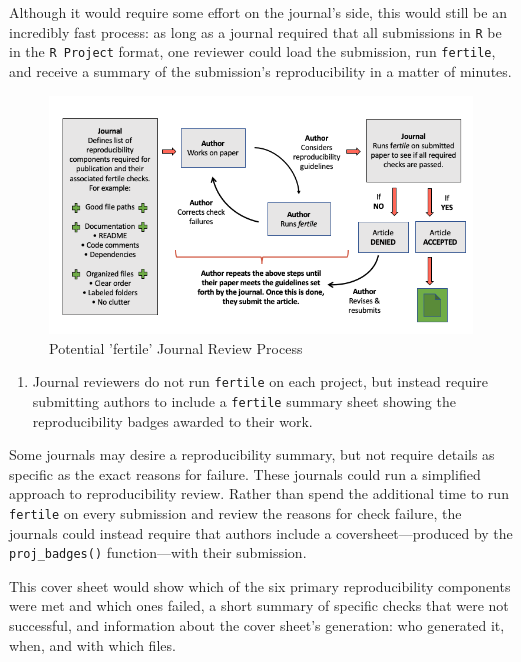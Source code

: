\documentclass[12pt,twoside]{reedthesis}
\providecommand{\tightlist}{%
  \setlength{\itemsep}{0pt}\setlength{\parskip}{0pt}}
\begin{document}
Although it would require some effort on the journal's side, this would still be an incredibly fast process: as long as a journal required that all submissions in \texttt{R} be in the \texttt{R\ Project} format, one reviewer could load the submission, run \texttt{fertile}, and receive a summary of the submission's reproducibility in a matter of minutes.
\begin{figure}
\includegraphics[width=1\linewidth]{figure/journal-process} \caption{Potential 'fertile' Journal Review Process}\label{fig:unnamed-chunk-43}
\end{figure}
\begin{enumerate}
\def\labelenumi{\arabic{enumi}.}
\setcounter{enumi}{1}
\tightlist
\item
  Journal reviewers do not run \texttt{fertile} on each project, but instead require submitting authors to include a \texttt{fertile} summary sheet showing the reproducibility badges awarded to their work.
\end{enumerate}
Some journals may desire a reproducibility summary, but not require details as specific as the exact reasons for failure. These journals could run a simplified approach to reproducibility review. Rather than spend the additional time to run \texttt{fertile} on every submission and review the reasons for check failure, the journals could instead require that authors include a coversheet---produced by the \texttt{proj\_badges()} function---with their submission.

This cover sheet would show which of the six primary reproducibility components were met and which ones failed, a short summary of specific checks that were not successful, and information about the cover sheet's generation: who generated it, when, and with which files.
\end{document}
